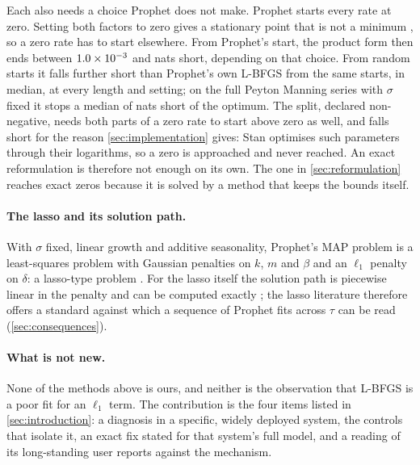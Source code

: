 Each also needs a choice Prophet does not make. Prophet starts every rate at zero.
Setting both factors to zero gives a stationary point that is not a minimum
\citep{hoff2017lasso}, so a zero rate has to start elsewhere. From Prophet's start, the
product form then ends between $1.0\times10^{-3}$ and \InsideHadamardStartMax{}
nats short, depending on that choice. From random starts it falls further short than
Prophet's own L-BFGS from the same starts, in median, at every length and setting; on
the full Peyton Manning series with $\sigma$ fixed it stops a median of
\InsideHadamardRandomMedianLong{} nats short of the optimum. The split, declared
non-negative, needs both parts of a zero rate to start above zero as well, and falls
short for the reason \cref{sec:implementation} gives: Stan optimises such parameters
through their logarithms, so a zero is approached and never reached. An exact
reformulation is therefore not enough on its own. The one in \cref{sec:reformulation}
reaches exact zeros because it is solved by a method that keeps the bounds itself.

\paragraph{The lasso and its solution path.}
With $\sigma$ fixed, linear growth and additive seasonality, Prophet's MAP problem
is a least-squares problem with Gaussian penalties on $k$, $m$ and $\beta$ and an
$\ell_1$ penalty on $\delta$: a lasso-type problem \citep{tibshirani1996regression}.
For the lasso itself the solution path is piecewise linear in the penalty and can
be computed exactly \citep{efron2004least}; the lasso literature therefore offers a
standard against which a sequence of Prophet fits across $\tau$ can be read
(\cref{sec:consequences}).

\paragraph{What is not new.}
None of the methods above is ours, and neither is the observation that L-BFGS is a
poor fit for an $\ell_1$ term. The contribution is the four items listed in
\cref{sec:introduction}: a diagnosis in a specific, widely deployed system, the
controls that isolate it, an exact fix stated for that system's full model, and a
reading of its long-standing user reports against the mechanism.
